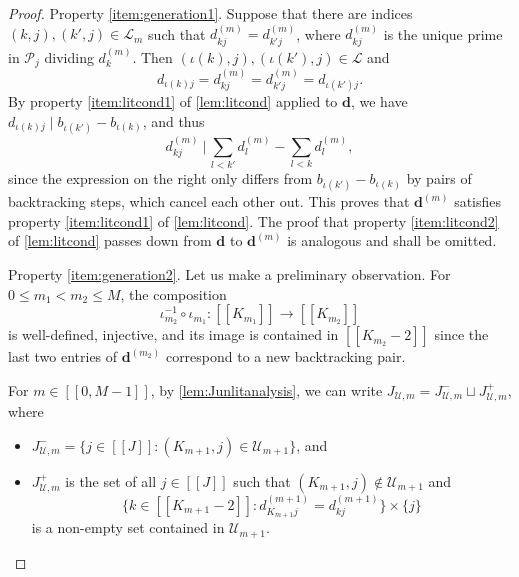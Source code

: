 \documentclass[11pt]{amsart}
\theoremstyle{definition}
\renewcommand{\leq}{\leqslant}
\newcommand{\interval}[2]{[\![#1,#2]\!] }
\newcommand{\sinterval}[1]{[\![#1]\!] }
\newcommand{\primes}{\mathcal{P}}
\renewcommand{\d}{\boldsymbol{d}}
\newcommand{\pcomp}[2]{d_{#1#2}}
\newcommand{\sommespart}{b}
\newcommand{\bmid}{\  \Big\vert}
\newcommand{\lit}{\mathcal{L}}
\newcommand{\unlit}{\mathcal{U}}
\newcommand{\repK}{K}
\newcommand{\newR}{\sinterval{J}}
\newcommand{\myfunction}{\iota}
\begin{document}
\begin{proof}
Property \cref{item:generation1}. Suppose that there are indices $(k,j), (k',j)\in \lit_m$ such that $d^{(m)}_{kj} = d^{(m)}_{k'j}$, where $d^{(m)}_{kj}$ is the unique prime in $\primes_j$ dividing $d^{(m)}_k$. Then $(\myfunction(k),j),(\myfunction(k'),j)\in \lit$ and 
\begin{equation*}
	\pcomp{\myfunction(k)}{j} = d^{(m)}_{kj} = d^{(m)}_{k'j} = \pcomp{\myfunction(k')}{j}.
\end{equation*}
By property \cref{item:litcond1} of \cref{lem:litcond} applied to $\d$, we have $\pcomp{\myfunction(k)}{j} \mid \sommespart_{\myfunction(k')} - \sommespart_{\myfunction(k)}$, and thus
\begin{equation*}
	d^{(m)}_{kj}\bmid\, \sum_{l<k'} d^{(m)}_l-\sum_{l<k} d^{(m)}_l,
\end{equation*}
since the expression on the right only differs from $\sommespart_{\myfunction(k')} - \sommespart_{\myfunction(k)}$ by pairs of backtracking steps, which cancel each other out. This proves that $\d^{(m)}$ satisfies property \cref{item:litcond1} of \cref{lem:litcond}. The proof that property \cref{item:litcond2} of \cref{lem:litcond} passes down from $\d$ to $\d^{(m)}$ is analogous and shall be omitted.
\medbreak
	
Property \cref{item:generation2}. Let us make a preliminary observation. For $0\leq m_1 < m_2\leq M$, the composition
\begin{equation*}
	\myfunction_{m_2}^{-1} \circ \myfunction_{m_1} : \sinterval{\repK_{m_1}} \to \sinterval{\repK_{m_2}}
\end{equation*}
is well-defined, injective, and its image is contained in $\sinterval{\repK_{m_2}-2}$ since the last two entries of $\d^{(m_2)}$ correspond to a new backtracking pair. 

For $m\in \interval{0}{M-1}$, by \cref{lem:Junlitanalysis}, we can write $J_{\unlit,m} = J_{\unlit,m}^- \sqcup J_{\unlit,m}^+$, where 
\begin{itemize}
	\item ${J_{\unlit,m}^- = \{j\in \newR : (\repK_{m+1},j)\in \unlit_{m+1}\}}$, and
	\item $J_{\unlit,m}^+$ is the set of all $j\in \newR$ such that $(\repK_{m+1},j) \not\in\unlit_{m+1}$ and
	\begin{equation}
	\label{eq:setcontainedinu}
		{\big\{k\in \sinterval{\repK_{m+1}-2}: \pcomp{\repK_{m+1}}{j}^{(m+1)} = \pcomp{k}{j}^{(m+1)}\big\}} \times \{j\}
	\end{equation}
	is a non-empty set contained in $\unlit_{m+1}$.
\end{itemize}


\end{proof}
\end{document}
